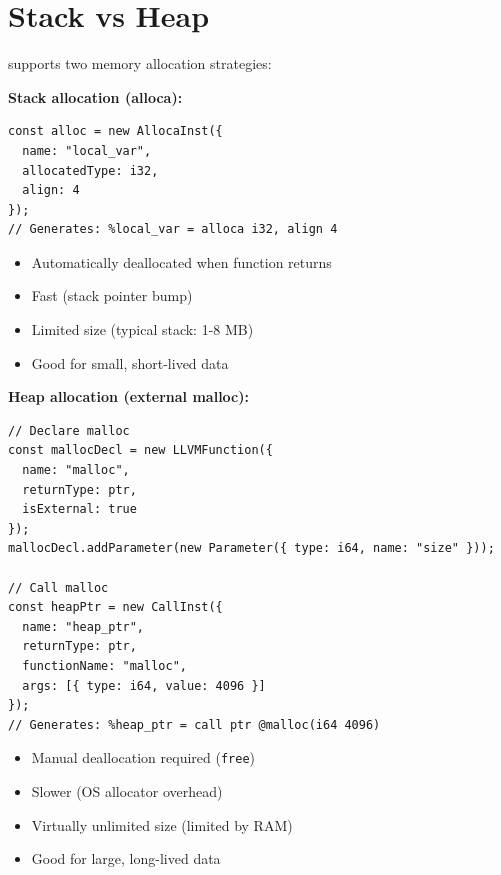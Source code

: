 \section{Stack vs Heap}

  supports two memory allocation strategies:

\textbf{Stack allocation (alloca):}
\begin{lstlisting}[style=ts]
const alloc = new AllocaInst({
  name: "local_var",
  allocatedType: i32,
  align: 4
});
// Generates: %local_var = alloca i32, align 4
\end{lstlisting}

\begin{itemize}[noitemsep]
  \item Automatically deallocated when function returns
  \item Fast (stack pointer bump)
  \item Limited size (typical stack: 1-8 MB)
  \item Good for small, short-lived data
\end{itemize}

\textbf{Heap allocation (external malloc):}
\begin{lstlisting}[style=ts]
// Declare malloc
const mallocDecl = new LLVMFunction({
  name: "malloc",
  returnType: ptr,
  isExternal: true
});
mallocDecl.addParameter(new Parameter({ type: i64, name: "size" }));

// Call malloc
const heapPtr = new CallInst({
  name: "heap_ptr",
  returnType: ptr,
  functionName: "malloc",
  args: [{ type: i64, value: 4096 }]
});
// Generates: %heap_ptr = call ptr @malloc(i64 4096)
\end{lstlisting}

\begin{itemize}[noitemsep]
  \item Manual deallocation required (\texttt{free})
  \item Slower (OS allocator overhead)
  \item Virtually unlimited size (limited by RAM)
  \item Good for large, long-lived data
\end{itemize}

